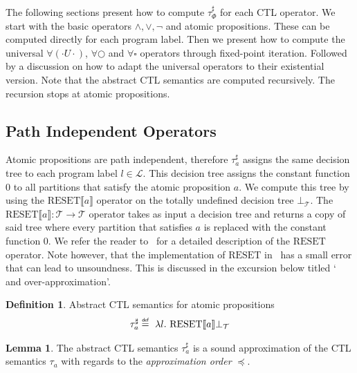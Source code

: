\documentclass[11pt,a4paper,titlepage]{article}
\theoremstyle{definition}
\newtheorem{definition}{Definition}[section]
\newtheorem{lemma}[theorem]{Lemma}
\newcommand\eqdef{\mathrel{\overset{\makebox[0pt]{\mbox{\normalfont\tiny\sffamily def}}}{=}}}
\begin{document}
The following sections present how to compute $\tau^{\sharp}_\Phi$ for each CTL operator. 
We start with the basic operators $\land, \lor, \neg$ and atomic propositions. 
These can be computed directly for each program label. 
Then we present how to compute the universal $\forall(\cdot U \cdot)$, $\forall\bigcirc$ and $\forall\square$ operators through fixed-point iteration. 
Followed by a discussion on how to adapt the universal operators to their existential version. 
Note that the abstract CTL semantics are computed recursively. The recursion stops at atomic propositions.

\subsection{Path Independent Operators}

Atomic propositions are path independent, therefore $\tau^{\sharp}_a$ assigns the same decision tree to 
each program label $l \in \mathcal{L}$. This decision tree assigns the constant function $0$ to all partitions that satisfy the atomic proposition $a$.
We compute this tree by using the $\text{RESET} \llbracket a \rrbracket$ operator on the totally undefined decision tree $\bot_\mathcal{T}$. 
The $\text{RESET}\llbracket a \rrbracket \colon \mathcal{T} \rightarrow \mathcal{T}$ operator takes as input a decision tree and returns a copy of 
said tree where every partition that satisfies $a$ is replaced with the constant function $0$. We refer the reader to~\cite{UrbanPhd}
for a detailed description of the $\text{RESET}$ operator. Note however, that the implementation of $\text{RESET}$ in~\cite{UrbanPhd} 
has a small error that can lead to unsoundness. This is discussed in the excursion below titled ` and over-approximation'.


\begin{definition}\label{def:abstract_ctl_semantics_atomic}
    Abstract CTL semantics for atomic propositions
    \begin{align}
        \tau^{\sharp}_{a} \eqdef \ \lambda l. \ \text{RESET} \llbracket a \rrbracket \bot_\mathcal{T}
    \end{align}
\end{definition}

\begin{lemma}
    The abstract CTL semantics $\tau^{\sharp}_{a}$ is a sound approximation of the
    CTL semantics $\tau_{a}$ with regards to the \textit{approximation order} $\preceq$.
\end{lemma}
\end{document}
